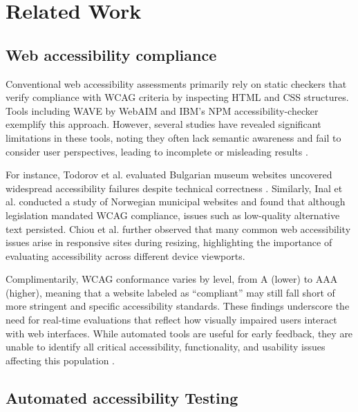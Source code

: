 
\section{Related Work}
\subsection{Web accessibility compliance}

Conventional web accessibility assessments primarily rely on static checkers that verify compliance with \ac{WCAG} criteria by inspecting HTML and CSS structures. Tools including WAVE by WebAIM\cite{webaim_wave_2025} and IBM's NPM accessibility-checker\cite{ibm_accessibility_checker_2025} exemplify this approach. However, several studies have revealed significant limitations in these tools, noting they often lack semantic awareness and fail to consider user perspectives, leading to incomplete or misleading results \cite{ara2024inclusive}. 

For instance, Todorov et al. evaluated Bulgarian museum websites uncovered widespread accessibility failures despite technical correctness \cite{todorov2022accessibility}. Similarly, Inal et al. conducted a study of Norwegian municipal websites and found that although legislation mandated \ac{WCAG} compliance, issues such as low-quality alternative text persisted.
Chiou et al. further observed that many common web accessibility issues arise in responsive sites during resizing, highlighting the importance of evaluating accessibility across different device viewports\cite{chiou2024automatically}.

Complimentarily, \ac{WCAG} conformance varies by level, from A (lower) to AAA (higher), meaning that a website labeled as “compliant” may still fall short of more stringent and specific accessibility standards. These findings underscore the need for real-time evaluations that reflect how visually impaired users interact with web interfaces. 
While automated tools are useful for early feedback, they are unable to identify all critical accessibility, functionality, and usability issues affecting this population \cite{todorov2022accessibility}.
\vspace{-8pt}

\subsection{Automated accessibility Testing}

